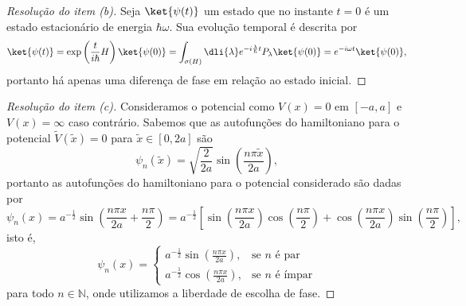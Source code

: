 \begin{proof}[Resolução do item (b)]
    Seja \(\ket{\psi(t)}\) um estado que no instante \(t=0\) é um estado estacionário de energia \(\hbar \omega\). Sua evolução temporal é descrita por
    \begin{equation*}
        \ket{\psi(t)} = \exp\left(\frac{t}{i\hbar}H\right)\ket{\psi(0)} = \int_{\sigma(H)} \dli{\lambda} e^{-i\frac{\lambda}{\hbar} t}P_{\lambda} \ket{\psi(0)} = e^{-i\omega t} \ket{\psi(0)},
    \end{equation*}
    portanto há apenas uma diferença de fase em relação ao estado inicial.
\end{proof}

\begin{proof}[Resolução do item (c)]
    Consideramos o potencial como \(V(x) = 0\) em \([-a,a]\) e \(V(x) = \infty\) caso contrário. Sabemos que as autofunções do hamiltoniano para o potencial \(\tilde{V}(\tilde{x}) = 0\) para \(\tilde{x} \in [0,2a]\) são
    \begin{equation*}
        \psi_n(\tilde{x}) = \sqrt{\frac{2}{2a}} \sin\left(\frac{n\pi \tilde{x}}{2a}\right),
    \end{equation*}
    portanto as autofunções do hamiltoniano para o potencial considerado são dadas por
    \begin{equation*}
        \psi_n(x) = a^{-\frac12} \sin\left(\frac{n \pi x}{2a} + \frac{n \pi}{2}\right) = a^{-\frac12} \left[\sin\left(\frac{n \pi x}{2a}\right)\cos\left(\frac{n\pi}{2}\right) + \cos\left(\frac{n \pi x}{2a}\right)\sin\left(\frac{n\pi}{2}\right)\right],
    \end{equation*}
    isto é,
    \begin{equation*}
        \psi_n(x) = \begin{cases}
            a^{-\frac12} \sin\left(\frac{n \pi x}{2a}\right),&\text{se }n\text{ é par}\\
            a^{-\frac12} \cos\left(\frac{n \pi x}{2a}\right),&\text{se }n\text{ é ímpar}
        \end{cases}
    \end{equation*}
    para todo \(n \in \mathbb{N}\), onde utilizamos a liberdade de escolha de fase.


\end{proof}
